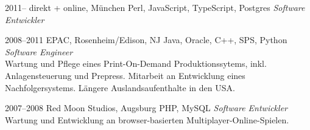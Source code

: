 \documentclass[]{friggeri-cv-a4}
\begin{document}

\begin{entrylist}
\entry
{2011--}
{direkt + online, München}
{Perl, JavaScript, TypeScript, Postgres}
{\emph{Software Entwickler} \\
}
\end{entrylist}


\begin{entrylist}
\entry
{2008--2011}
{EPAC, Rosenheim/Edison, NJ}
{Java, Oracle, C++, SPS, Python}
{\emph{Software Engineer} \\
Wartung und Pflege eines Print-On-Demand Produktionssytems, inkl. Anlagensteuerung und Prepress. Mitarbeit an Entwicklung eines Nachfolgersystems. Längere Auslandsaufenthalte in den USA.}
\end{entrylist}


\begin{entrylist}
\entry
{2007--2008}
{Red Moon Studios, Augsburg}
{PHP, MySQL}
{\emph{Software Entwickler} \\
Wartung und Entwicklung an browser-basierten Multiplayer-Online-Spielen.}
\end{entrylist}
\end{document}

